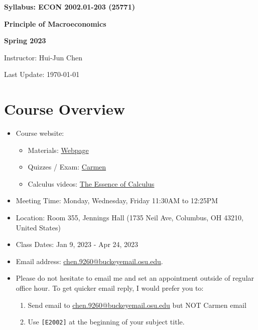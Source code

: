 \documentclass[12pt]{article}
\begin{document}
\centerline{\huge\bf Syllabus: ECON 2002.01-203 (25771)}
\medskip
\centerline{\LARGE \bf Principle of Macroeconomics}
\medskip
\centerline{\LARGE \bf Spring 2023}
\medskip
\centerline{\Large Instructor: Hui-Jun Chen}
\centerline{Last Update: \today}

\medskip

\section*{Course Overview}
\begin{itemize}

    \item Course website:
    \begin{itemize}
        \item Materials: \href{https://huijunchen9260.github.io/IntermediateMacroAutumn2022.html}{Webpage}
        \item Quizzes / Exam: \href{https://osu.instructure.com/courses/127406}{Carmen}
        \item Calculus videos: \href{https://www.youtube.com/watch?v=WUvTyaaNkzM&list=PLZHQObOWTQDMsr9K-rj53DwVRMYO3t5Yr}{The Essence of Calculus}
    \end{itemize}
    \item Meeting Time: Monday, Wednesday, Friday 11:30AM to 12:25PM
    \item Location: Room 355, Jennings Hall (1735 Neil Ave, Columbus, OH 43210, United States)
    \item Class Dates: Jan 9, 2023 - Apr 24, 2023
    \item Email address: \href{chen.9260@buckeyemail.osu.edu}{chen.9260@buckeyemail.osu.edu}.
    \item Please do not hesitate to email me and set an appointment outside of regular office hour. To get quicker email reply, I would prefer you to:
    \begin{enumerate}
        \item Send email to \href{chen.9260@buckeyemail.osu.edu}{chen.9260@buckeyemail.osu.edu} but NOT Carmen email
        \item Use \texttt{[E2002]} at the beginning of your subject title.

\end{enumerate}
\end{itemize}
\end{document}
